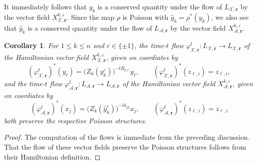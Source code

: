 \documentclass{amsart}
\newtheorem{corollary}[theorem]{Corollary}
\numberwithin{equation}{section}
\newcommand{\bfr}{{\boldsymbol{r}}}
\newcommand{\cA}{\mathcal{A}}
\newcommand{\cX}{\mathcal{X}}
\begin{document}
It immediately follows that $y_k$ is a conserved quantity under the flow of $L_{\cX,\bfr}$ by the vector field $X_{\cX,\bfr}^{k,\varepsilon}$.
Since the map $\rho$ is Poisson with $\hat y_k=\rho^*(y_k)$, we also see that $\hat y_k$ is a conserved quantity under the flow of $L_{\cA,\bfr}$ by the vector field $X_{\cA,\bfr}^{k,\varepsilon}$.
\begin{corollary}
  \label{cor:time-one flows}
  For $1\le k\le n$ and $\varepsilon\in\{\pm1\}$, the time-$t$ flow $\varphi_{\cX,\bfr}^t:L_{\cX,\bfr}\to L_{\cX,\bfr}$ of the Hamiltonian vector field $X_{\cX,\bfr}^{k,\varepsilon}$, given on coordiates by
  \[(\varphi_{\cX,\bfr}^t)^*(y_\ell)=\big(Z_k(y_k^\varepsilon)\big)^{-tB_{k\ell}}y_\ell,\qquad (\varphi_{\cX,\bfr}^t)^*(z_{\ell,i})=z_{\ell,i},\]
  and the time-$t$ flow $\varphi_{\cA,\bfr}^t:L_{\cA,\bfr}\to L_{\cA,\bfr}$ of the Hamiltonian vector field $X_{\cA,\bfr}^{k,\varepsilon}$, given on coordiates by
  \[(\varphi_{\cA,\bfr}^t)^*(x_j)=\big(Z_k(\hat y_k^\varepsilon)\big)^{-t\delta_{jk}}x_j,\qquad (\varphi_{\cA,\bfr}^t)^*(z_{\ell,i})=z_{\ell,i}\]
  both preserve the respective Poisson structures.
\end{corollary}
\begin{proof}
  The computation of the flows is immediate from the preceding discussion.
  That the flow of these vector fields preserve the Poisson structures follows from their Hamiltonian definition.
\end{proof}
\end{document}
